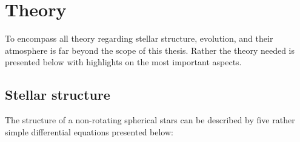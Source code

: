 \chapter{Theory}

To encompass all theory regarding stellar structure, evolution, and their
atmosphere is far beyond the scope of this thesis. Rather the theory needed is
presented below with highlights on the most important aspects.

\section{Stellar structure}

The structure of a non-rotating spherical stars can be described by five rather
simple differential equations \citep[see e.g.][]{kippenhahn} presented below:
